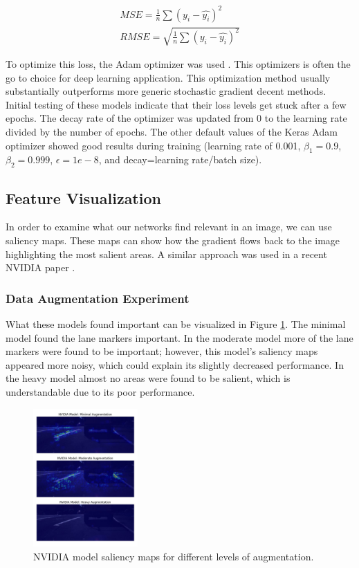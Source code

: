 \documentclass[10pt,twocolumn,letterpaper]{article}
\begin{document}
\begin{equation} \label{mse}
\begin{split}
MSE=\frac{1}{n} \sum (y_{i}-\hat{y_{i}})^{2}\\
RMSE=\sqrt{\frac{1}{n} \sum (y_{i}-\hat{y_{i}})^{2}} 
\end{split}
\end{equation}

To optimize this loss, the Adam optimizer was used \cite{kingma2014adam}. This optimizers is often the go to choice for deep learning application. This optimization method usually substantially outperforms more generic stochastic gradient decent methods. Initial testing of these models indicate that their loss levels get stuck after a few epochs. The decay rate of the optimizer was updated from 0 to the learning rate divided by the number of epochs. The other default values of the Keras Adam optimizer showed good results during training (learning rate of 0.001, $\beta_{1}=0.9$, $\beta_{2}=0.999$, $\epsilon=1e-8$, and decay=learning rate/batch size).



\subsection{Feature Visualization}

In order to examine what our networks find relevant in an image, we can use saliency maps. These maps can show how the gradient flows back to the image highlighting the most salient areas. A similar approach was used in a recent NVIDIA paper \cite{bojarski2017explaining}.

\subsubsection{Data Augmentation Experiment}
What these models found important can be visualized in Figure \ref{nvidia_aug}. The minimal model found the lane markers important. In the moderate model more of the lane markers were found to be important; however, this model's saliency maps appeared more noisy, which could explain its slightly decreased performance. In the heavy model almost no areas were found to be salient, which is understandable due to its poor performance. 

 \begin{figure}[!htb]
	\includegraphics[width=4cm]{nvidia_aug_test_vert.png}
	\centering
	\caption{NVIDIA model saliency maps for different levels of augmentation.}
	\label{nvidia_aug}
\end{figure}
\end{document}
